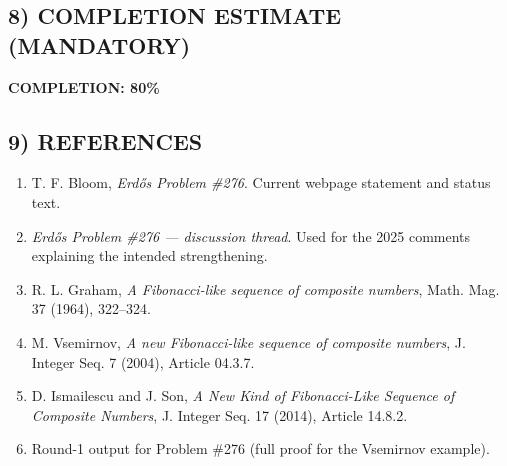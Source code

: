 \subsection*{8) COMPLETION ESTIMATE (MANDATORY)}

\textbf{COMPLETION: 80\%}

\subsection*{9) REFERENCES}

\begin{enumerate}
\item T. F. Bloom, \emph{Erd\H{o}s Problem \#276}.  Current webpage statement and status text.
\item \emph{Erd\H{o}s Problem \#276 --- discussion thread}.  Used for the 2025 comments explaining the intended strengthening.
\item R. L. Graham, \emph{A Fibonacci-like sequence of composite numbers}, Math. Mag. 37 (1964), 322--324.
\item M. Vsemirnov, \emph{A new Fibonacci-like sequence of composite numbers}, J. Integer Seq. 7 (2004), Article 04.3.7.
\item D. Ismailescu and J. Son, \emph{A New Kind of Fibonacci-Like Sequence of Composite Numbers}, J. Integer Seq. 17 (2014), Article 14.8.2.
\item Round-1 output for Problem \#276 (full proof for the Vsemirnov example).
\end{enumerate}
